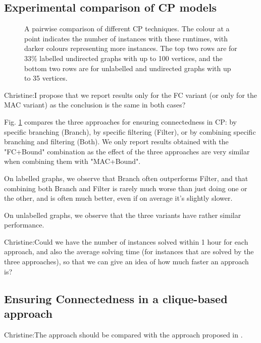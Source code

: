 \documentclass{llncs}
\newcommand{\christine}[1]{{\color{green} Christine:#1}}
\begin{document}
\subsection{ Experimental comparison of CP models}\label{mccs-cp-eval}


\begin{figure}[p]
    \centering
    
    \caption{A pairwise comparison of different CP techniques. The colour at a point indicates the
    number of instances with these runtimes, with darker colours representing more instances. The
    top two rows are for 33\% labelled undirected graphs with up to 100 vertices, and the bottom two
    rows are for unlabelled and undirected graphs with up to 35 vertices.}
        \label{figure:connected-cp}
\end{figure}

\christine{I propose that we report results only for the FC variant (or only for the MAC variant) as
the conclusion is the same in both cases?}

Fig. \ref{figure:connected-cp} compares the three approaches for ensuring connectedness in CP: by
specific branching (Branch), by specific filtering (Filter), or by combining specific branching and
filtering (Both). We only report results obtained with the "FC+Bound" combination as the effect of
the three approaches are very similar when combining them with "MAC+Bound".

On labelled graphs, we observe that Branch often outperforms Filter, and that combining both Branch
and Filter is rarely much worse than just doing one or the other, and is often much better, even if
on average it's slightly slower.

On unlabelled graphs, we observe that the three variants have rather similar performance.

\christine{Could we have the number of instances solved within 1 hour for each approach, and also
the average solving time (for instances that are solved by the three approaches), so that we can
give an idea of how much faster an approach is?}

\subsection{Ensuring Connectedness in a clique-based approach}\label{mccs-clique}

\christine{The approach should be compared with the approach proposed in \cite{DBLP:conf/mco/VismaraV08}.}
\end{document}
